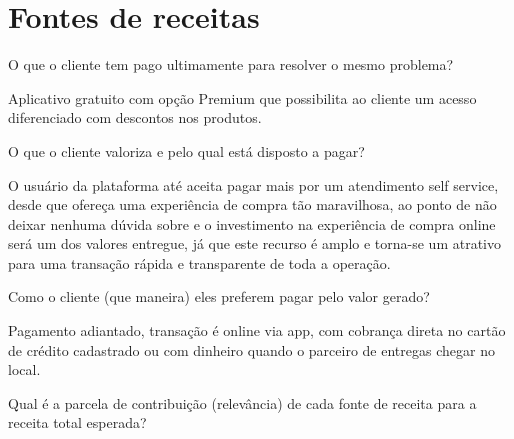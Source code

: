 \section{\textbf{Fontes de receitas}}
\label{sec: Fontes de receitas}

\begin{commentA} \vspace{0.3cm} \noindent  O que o cliente tem pago ultimamente para resolver o mesmo problema? \par \vspace{0.1cm} \end{commentA}


Aplicativo gratuito com opção Premium que possibilita ao cliente um acesso diferenciado com descontos nos produtos.\par

\begin{commentA} \vspace{0.3cm} \noindent O que o cliente valoriza e pelo qual está disposto a pagar? \par \vspace{0.1cm} \end{commentA}


O usuário da plataforma até aceita pagar mais por um atendimento self service, desde que ofereça uma experiência de compra tão maravilhosa, ao ponto de não deixar nenhuma dúvida sobre e o investimento na experiência de compra online será um dos valores entregue, já que este recurso é amplo e torna-se um atrativo para uma transação rápida e transparente de toda a operação.\par

\begin{commentA} \vspace{0.3cm} \noindent Como o cliente (que maneira) eles preferem pagar pelo valor gerado? \par \vspace{0.1cm} \end{commentA}


Pagamento adiantado, transação é online via app, com cobrança direta no cartão de crédito cadastrado ou com dinheiro quando o parceiro de entregas chegar no local.\par

\begin{commentA} \vspace{0.3cm} \noindent Qual é a parcela de contribuição (relevância) de cada fonte de receita para a receita total esperada? \par \vspace{0.1cm} \end{commentA}


